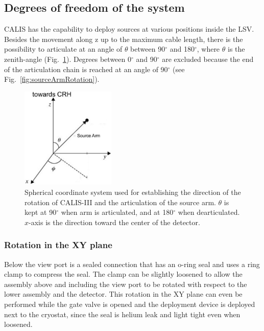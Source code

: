 \subsection{Degrees of freedom of the system}

CALIS has the capability to deploy sources at various positions inside the LSV. Besides the movement along z up to the maximum cable length, there is the possibility to articulate at an angle of $\theta$ between 90$^{\circ}$ and 180$^{\circ}$, where $\theta$ is the zenith-angle (Fig.~\ref{fig:coordinate_system}). Degrees between 0$^{\circ}$ and 90$^{\circ}$ are excluded because the end of the articulation chain is reached at an angle of 90$^{\circ}$ (see Fig.~\ref{fig:sourceArmRotation}).

\begin{figure}[htbp]
 \centering
  \includegraphics[width=0.4\textwidth]{Figures/coordinate_system}
  \caption{Spherical coordinate system used for establishing the direction of the rotation of CALIS-III and the articulation of the source arm. $\theta$ is kept at 90$^{\circ}$ when arm is articulated, and at 180$^{\circ}$ when dearticulated. $x$-axis is the direction toward the center of the detector. }
  \label{fig:coordinate_system}
\end{figure} 

\subsubsection{Rotation in the XY plane}
Below the view port is a sealed connection that has an o-ring seal and uses a ring clamp to compress the seal. The clamp can be slightly loosened to allow the assembly above and including the view port to be rotated with respect to the lower assembly and the detector. This rotation in the XY plane can even be performed while the gate valve is opened and the deployment device is deployed next to the cryostat, since the seal is helium leak and light tight even when loosened.

